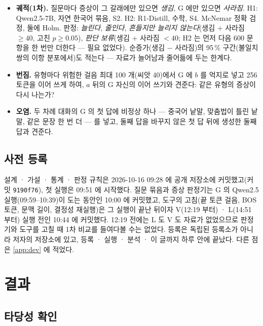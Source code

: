 \documentclass[11pt]{article}
\begin{document}
\begin{itemize}
\item \textbf{궤적(1차).} 질문마다 증상이 그 갈래에만 있으면 \emph{생김}, G 에만 있으면 \emph{사라짐}. H1: Qwen2.5-7B, 자연
      한국어 묶음, S2. H2: R1-Distill, 수학, S4. McNemar 정확 검정, 둘에 Holm. 판정: \emph{늘린다}, \emph{줄인다}, \emph{흔들지만
      늘리지 않는다}(생김 + 사라짐 $\ge 40$, 고친 $p\ge 0.05$), \emph{판단 보류}(생김 + 사라짐 $<40$; H2 는 먼저 다음 600 문항을
      한 번만 더한다 --- 필요 없었다). 순증가(생김 $-$ 사라짐)의 95\,\% 구간(불일치 쌍의 이항 분포에서)도 적는다 --- 자료가
      늘어남과 줄어듦에 두는 한계다.
\item \textbf{번짐.} 유형마다 위험한 걸음 최대 100 개(씨앗 40)에서 G 에 $b$ 를 억지로 넣고 256 토큰을 이어 쓰게 하여, $a$ 뒤의 G
      자신의 이어 쓰기와 견준다: 같은 유형의 증상이 다시 나는가?
\item \textbf{오염.} 두 차례 대화의 G 의 첫 답에 비정상 하나 --- 중국어 낱말, 맞춤법이 틀린 낱말, 같은 문장 한 번 더 --- 를
      넣고, 둘째 답을 바꾸지 않은 첫 답 뒤에 생성한 둘째 답과 견준다.
\end{itemize}

\subsection{사전 등록}\label{sec:prereg}

설계 · 가설 · 통계 · 판정 규칙은 2026-10-16 09:28 에 공개 저장소에 커밋했고(커밋 \texttt{9190f76}), 첫 실행은 09:51 에
시작했다. 질문 묶음과 증상 판정기는 G 의 Qwen2.5 실행(09:59--10:39)이 도는 동안인 10:00 에 커밋했고, 도구의 고침(끝 토큰 걸음,
BOS 토큰, 문맥 길이, 결정성 재실행)은 그 실행이 끝난 뒤이자 V(12:19 부터) · L(14:51 부터) 실행 전인 10:44 에 커밋했다. 12:19
전에는 L 도 V 도 자료가 없었으므로 판정기와 도구를 고칠 때 1차 비교를 들여다볼 수는 없었다. 등록은 독립된 등록소가 아니라
저자의 저장소에 있고, 등록 · 실행 · 분석 · 이 글까지 하루 안에 끝났다. 다른 점은 \ref{app:dev} 에 적었다.

\section{결과}\label{sec:results}

\subsection{타당성 확인}\label{sec:validity}
\end{document}
